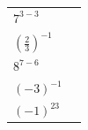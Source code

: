 {\begin{center}
\begin{xtabular*}{\mytablewidth}[t]{|p{10\mystarwidth}|p{10\mystarwidth}|}
     \tabularnewline{}
                  ${7}^{3-3}$
                 &
     \tabularnewline{}
                  ${\left(\frac{2}{3}\right)}^{-1}$
                 &
     \tabularnewline{}
                  ${8}^{7-6}$
                 &
     \tabularnewline{}
                  ${\left(-3\right)}^{-1}$
                 &
     \tabularnewline{}
                  ${\left(-1\right)}^{23}$

\end{xtabular*}
\end{center}}
